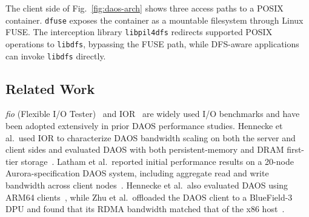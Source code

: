 The client side of Fig.~\ref{fig:daos-arch} shows three access paths to a POSIX container. \texttt{dfuse} exposes the container as a mountable filesystem through Linux FUSE. The interception library \texttt{libpil4dfs} redirects supported POSIX operations to \texttt{libdfs}, bypassing the FUSE path, while DFS-aware applications can invoke \texttt{libdfs} directly.









\subsection{Related Work}


\textit{fio} (Flexible I/O Tester)~\cite{fio-github} and IOR~\cite{ior-github, ior-paper2008sc} are widely used I/O benchmarks and have been adopted extensively in prior DAOS performance studies. Hennecke et al.\ used IOR to characterize DAOS bandwidth scaling on both the server and client sides and evaluated DAOS with both persistent-memory and DRAM first-tier storage~\cite{daos-scalability2023SCAsia, daos-dram-intro2023}. Latham et al.\ reported initial performance results on a 20-node Aurora-specification DAOS system, including aggregate read and write bandwidth across client nodes~\cite{DAOS-aurora-20-node-test2024scw}. Hennecke et al.\ also evaluated DAOS using ARM64 clients~\cite{daos-arm2023SCAsia}, while Zhu et al.\ offloaded the DAOS client to a BlueField-3 DPU and found that its RDMA bandwidth matched that of the x86 host~\cite{daos-smartnic2025scw}.


